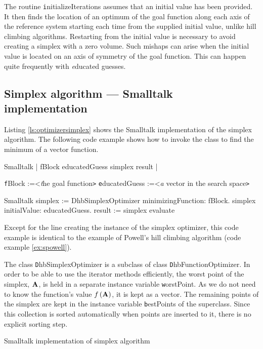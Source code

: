 The routine {\texttt initializeIterations} assumes that an initial
value has been provided. It then finds the location of an optimum
of the goal function along each axis of the reference system
starting each time from the supplied initial value, unlike hill
climbing algorithms. Restarting from the initial value is
necessary to avoid creating a simplex with a zero volume. Such
mishaps can arise when the initial value is located on an axis of
symmetry of the goal function.
This can happen quite frequently with {\textsl educated guesses}.

\subsection{Simplex algorithm --- Smalltalk implementation}
 Listing \ref{ls:optimizersimplex} shows
the Smalltalk implementation of the simplex algorithm. The
following code example shows how to invoke the class to find the
minimum of a vector function.

\begin{displaycode}{Smalltalk}
 | fBlock educatedGuess simplex result |
\end{displaycode}
 {\texttt fBlock :=<\textsl the goal function\texttt >}\hfil\break
 {\texttt educatedGuess :=<\textsl a vector in the search space\texttt >}
\begin{displaycode}{Smalltalk}
 simplex := DhbSimplexOptimizer minimizingFunction: fBlock.
 simplex initialValue: educatedGuess.
 result := simplex evaluate
\end{displaycode}
Except for the line creating the instance of the simplex
optimizer, this code example is identical to the example of
Powell's hill climbing algorithm (code example \ref{ex:spowell}).

The class {\texttt DhbSimplexOptimizer} is a subclass of class {\texttt
DhbFunctionOptimizer}. In order to be able to use the iterator
methods efficiently, the worst point of the simplex, ${\textbf A}$, is
held in a separate instance variable {\texttt worstPoint}. As we do
not need to know the function's value $f\left({\textbf A}\right)$, it
is kept as a vector. The remaining points of the simplex are kept
in the instance variable {\texttt bestPoints} of the superclass. Since
this collection is sorted automatically when points are inserted
to it, there is no explicit sorting step.

\begin{listing} Smalltalk implementation of simplex algorithm
\label{ls:optimizersimplex}

\end{listing}

